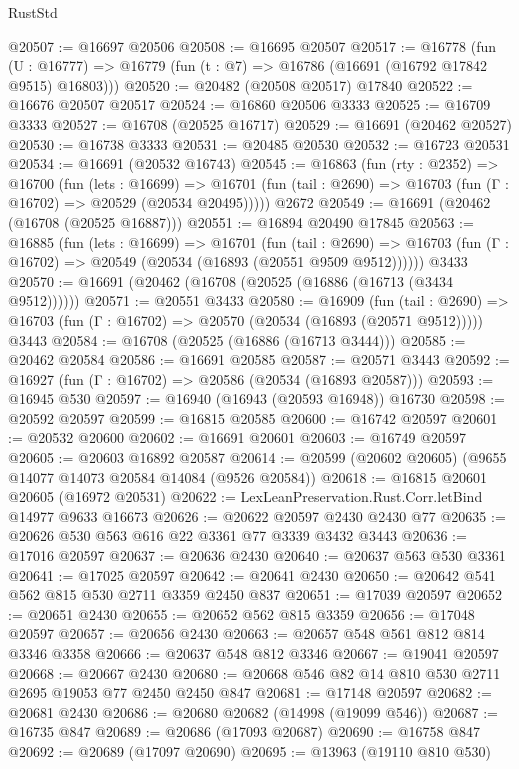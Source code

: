 \begin{lexlean}{RustStd}
\begin{coremodule}
@20507 := @16697 @20506
@20508 := @16695 @20507
@20517 := @16778
    (fun (U : @16777) => @16779 (fun (t : @7) => @16786 (@16691 (@16792 @17842 @9515) @16803)))
@20520 := @20482 (@20508 @20517) @17840
@20522 := @16676 @20507 @20517
@20524 := @16860 @20506 @3333
@20525 := @16709 @3333
@20527 := @16708 (@20525 @16717)
@20529 := @16691 (@20462 @20527)
@20530 := @16738 @3333
@20531 := @20485 @20530
@20532 := @16723 @20531
@20534 := @16691 (@20532 @16743)
@20545 := @16863
    (fun (rty : @2352) =>
    @16700
      (fun (lets : @16699) =>
      @16701 (fun (tail : @2690) => @16703 (fun (Γ : @16702) => @20529 (@20534 @20495)))))
    @2672
@20549 := @16691 (@20462 (@16708 (@20525 @16887)))
@20551 := @16894 @20490 @17845
@20563 := @16885
    (fun (lets : @16699) =>
    @16701
      (fun (tail : @2690) =>
      @16703 (fun (Γ : @16702) => @20549 (@20534 (@16893 (@20551 @9509 @9512))))))
    @3433
@20570 := @16691 (@20462 (@16708 (@20525 (@16886 (@16713 (@3434 @9512))))))
@20571 := @20551 @3433
@20580 := @16909
    (fun (tail : @2690) => @16703 (fun (Γ : @16702) => @20570 (@20534 (@16893 (@20571 @9512)))))
    @3443
@20584 := @16708 (@20525 (@16886 (@16713 @3444)))
@20585 := @20462 @20584
@20586 := @16691 @20585
@20587 := @20571 @3443
@20592 := @16927 (fun (Γ : @16702) => @20586 (@20534 (@16893 @20587)))
@20593 := @16945 @530
@20597 := @16940 (@16943 (@20593 @16948)) @16730
@20598 := @20592 @20597
@20599 := @16815 @20585
@20600 := @16742 @20597
@20601 := @20532 @20600
@20602 := @16691 @20601
@20603 := @16749 @20597
@20605 := @20603 @16892 @20587
@20614 := @20599 (@20602 @20605) (@9655 @14077 @14073 @20584 @14084 (@9526 @20584))
@20618 := @16815 @20601 @20605 (@16972 @20531)
@20622 := LexLeanPreservation.Rust.Corr.letBind @14977 @9633 @16673
@20626 := @20622 @20597 @2430 @2430 @77
@20635 := @20626 @530 @563 @616 @22 @3361 @77 @3339 @3432 @3443
@20636 := @17016 @20597
@20637 := @20636 @2430
@20640 := @20637 @563 @530 @3361
@20641 := @17025 @20597
@20642 := @20641 @2430
@20650 := @20642 @541 @562 @815 @530 @2711 @3359 @2450 @837
@20651 := @17039 @20597
@20652 := @20651 @2430
@20655 := @20652 @562 @815 @3359
@20656 := @17048 @20597
@20657 := @20656 @2430
@20663 := @20657 @548 @561 @812 @814 @3346 @3358
@20666 := @20637 @548 @812 @3346
@20667 := @19041 @20597
@20668 := @20667 @2430
@20680 := @20668 @546 @82 @14 @810 @530 @2711 @2695 @19053 @77 @2450 @2450 @847
@20681 := @17148 @20597
@20682 := @20681 @2430
@20686 := @20680 @20682 (@14998 (@19099 @546))
@20687 := @16735 @847
@20689 := @20686 (@17093 @20687)
@20690 := @16758 @847
@20692 := @20689 (@17097 @20690)
@20695 := @13963 (@19110 @810 @530)

\end{coremodule}
\end{lexlean}

